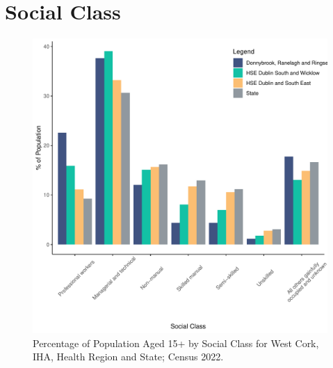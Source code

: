 \documentclass{article}
\begin{document}
\section{Social Class}\label{sect:SC}
\begin{figure}[H]
	\centering
	\includegraphics[width = 140mm]{../figures/SocialClassED.pdf}
	\caption{Percentage of Population Aged 15+ by Social Class for West Cork, IHA, Health Region and State; Census 2022.}
	\label{fig:vbnv}
	\end{figure}
\end{document}
